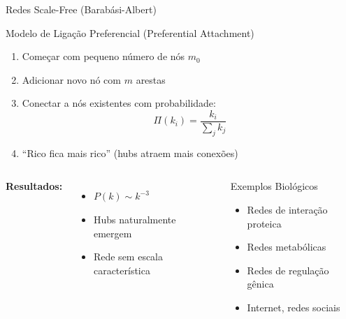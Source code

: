 \begin{frame}[shrink=15]{Redes Scale-Free (Barabási-Albert)}
\begin{block}{Modelo de Ligação Preferencial (Preferential Attachment)}
\begin{enumerate}
    \item Começar com pequeno número de nós $m_0$
    \item Adicionar novo nó com $m$ arestas
    \item Conectar a nós existentes com probabilidade:
    \begin{equation*}
    \Pi(k_i) = \frac{k_i}{\sum_j k_j}
    \end{equation*}
    \item ``Rico fica mais rico'' (hubs atraem mais conexões)
\end{enumerate}
\end{block}

\vspace{0.3cm}

\begin{columns}
\textbf{Resultados:}
\begin{itemize}
    \item $P(k) \sim k^{-3}$
    \item Hubs naturalmente emergem
    \item Rede sem escala característica
\end{itemize}

\begin{exampleblock}{Exemplos Biológicos}
\begin{itemize}
    \item Redes de interação proteica
    \item Redes metabólicas
    \item Redes de regulação gênica
    \item Internet, redes sociais
\end{itemize}
\end{exampleblock}
\end{columns}
\end{frame}

